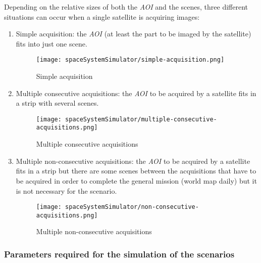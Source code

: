 Depending on the relative sizes of both the \emph{AOI} and the scenes, three different
situations can occur when a single satellite is acquiring images:
\begin{enumerate}
\item Simple acquisition: the \emph{AOI} (at least the part to be imaged by the
  satellite) fits into just one scene.

\begin{figure}[!h]
\begin{center}
\texttt{[image: spaceSystemSimulator/simple-acquisition.png]}
\caption{Simple acquisition}
\label{fig:sss-simple-acquisition}
\end{center}
\end{figure}
\item Multiple consecutive acquisitions: the \emph{AOI} to be acquired by a satellite
fits in a strip with several scenes.
\begin{figure}[!h]
\begin{center}
\texttt{[image: spaceSystemSimulator/multiple-consecutive-acquisitions.png]}
\caption{Multiple consecutive acquisitions}
\label{fig:sss-multiple-acquisition-diagram}
\end{center}
\end{figure}

\item Multiple non-consecutive acquisitions: the \emph{AOI} to be acquired by a
  satellite fits in a strip but there are some scenes between the acquisitions
  that have to be acquired in order to complete the general mission (world map
  daily) but it is not necessary for the scenario.

\begin{figure}[!h]
\begin{center}
\texttt{[image: spaceSystemSimulator/non-consecutive-acquisitions.png]}
\caption{Multiple non-consecutive acquisitions}
\label{fig:sss-non-consecutive-acquisition}
\end{center}
\end{figure}

\end{enumerate}


\subsubsection{Parameters required for the simulation of the scenarios}



